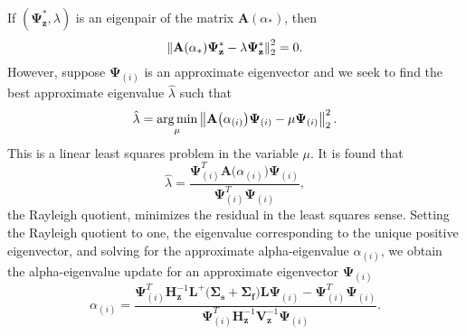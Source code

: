 If $(\mathbf{\Psi_{z}^{*}}, \lambda)$ is an eigenpair of the matrix $\mathbf{A}(\alpha_{*})$, then
\begin{equation}
\left\lVert\mathbf{A}(\alpha_{*}) \mathbf{\Psi_{z}^{*}} - \lambda \mathbf{\Psi_{z}^{*}}\right\rVert_{2}^{2} = 0.
\end{equation}
However, suppose $\mathbf{\Psi}_{(i)}$ is an approximate eigenvector and we seek to find the best approximate eigenvalue $\hat{\lambda}$ such that
\begin{equation}
\hat{\lambda} = \operatorname*{arg\,min}_{\mu} \left\lVert\mathbf{A}\big (\alpha_{(i)} \big ) \mathbf{\Psi}_{(i)} - \mu \mathbf{\Psi}_{(i)}\right\rVert_{2}^{2}. 
\end{equation}
This is a linear least squares problem in the variable $\mu$. It is found that \cite{horn_matrix_2012}
\begin{equation}
	\hat{\lambda} = \frac{\mathbf{\Psi}^{T}_{(i)} \mathbf{A}\big (\alpha_{(i)} \big ) \mathbf{\Psi}_{(i)}}{\mathbf{\Psi}^{T}_{(i)} \mathbf{\Psi}_{(i)}},
\end{equation}
the Rayleigh quotient, minimizes the residual in the least squares sense. Setting the Rayleigh quotient to one, the eigenvalue corresponding to the unique positive eigenvector, and solving for the approximate alpha-eigenvalue $\alpha_{(i)}$, we obtain the alpha-eigenvalue update for an approximate eigenvector $\mathbf{\Psi}_{(i)}$
\begin{equation}
	\alpha_{(i)} = \frac{ \mathbf{\Psi}^{T}_{(i)} \mathbf{H}^{-1}_{\mathbf{z}} \mathbf{L}^{+} \big ( \mathbf{\Sigma_{s}} + \mathbf{\Sigma_{f}} \big ) \mathbf{L} \mathbf{\Psi}_{(i)} -  \mathbf{\Psi}^{T}_{(i)}  \mathbf{\Psi}_{(i)}}{  \mathbf{\Psi}^{T}_{(i)} \mathbf{H}^{-1}_{\mathbf{z}} \mathbf{V}^{-1}_{\mathbf{z}}  \mathbf{\Psi}_{(i)}}.
	\label{eq:AlphaUpdateTwoSweep}
\end{equation}

